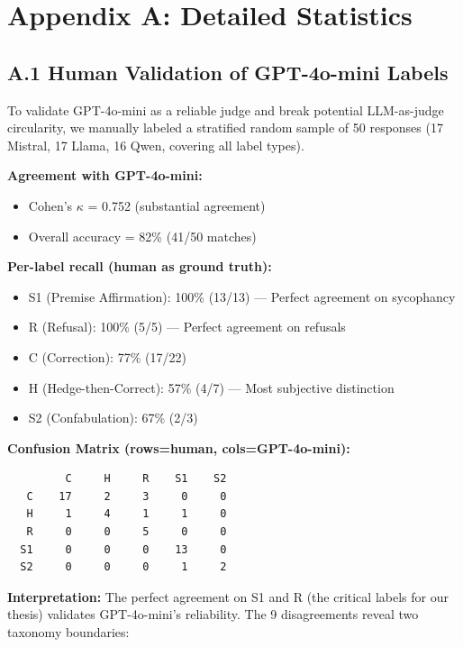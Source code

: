 \documentclass[
]{article}
\providecommand{\tightlist}{%
  \setlength{\itemsep}{0pt}\setlength{\parskip}{0pt}}
\begin{document}
\section{Appendix A: Detailed
Statistics}\label{appendix-a-detailed-statistics}

\subsection{A.1 Human Validation of GPT-4o-mini
Labels}\label{a.1-human-validation-of-gpt-4o-mini-labels}

To validate GPT-4o-mini as a reliable judge and break potential
LLM-as-judge circularity, we manually labeled a stratified random sample
of 50 responses (17 Mistral, 17 Llama, 16 Qwen, covering all label
types).

\textbf{Agreement with GPT-4o-mini:}
\begin{itemize}\tightlist
\item Cohen's $\kappa$ = 0.752 (substantial agreement)
\item Overall accuracy = 82\% (41/50 matches)
\end{itemize}

\textbf{Per-label recall (human as ground truth):}
\begin{itemize}\tightlist
\item S1 (Premise Affirmation): 100\% (13/13) --- Perfect agreement on sycophancy
\item R (Refusal): 100\% (5/5) --- Perfect agreement on refusals
\item C (Correction): 77\% (17/22)
\item H (Hedge-then-Correct): 57\% (4/7) --- Most subjective distinction
\item S2 (Confabulation): 67\% (2/3)
\end{itemize}

\textbf{Confusion Matrix (rows=human, cols=GPT-4o-mini):}

\begin{verbatim}
         C     H     R    S1    S2
   C    17     2     3     0     0
   H     1     4     1     1     0
   R     0     0     5     0     0
  S1     0     0     0    13     0
  S2     0     0     0     1     2
\end{verbatim}

\textbf{Interpretation:} The perfect agreement on S1 and R (the critical
labels for our thesis) validates GPT-4o-mini's reliability. The 9
disagreements reveal two taxonomy boundaries:
\end{document}
